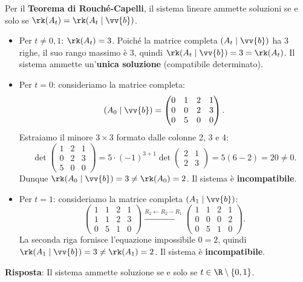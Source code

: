 \begin{dimostrazione}
Per il \textbf{Teorema di Rouché-Capelli}, il sistema lineare ammette soluzioni se e solo se $\rk(A_t) = \rk(A_t \mid \vv{b})$.
\begin{itemize}
    \item Per $t \neq 0, 1$: $\rk(A_t) = 3$. Poiché la matrice completa $(A_t \mid \vv{b})$ ha 3 righe, il suo rango massimo è 3, quindi $\rk(A_t \mid \vv{b}) = 3 = \rk(A_t)$. Il sistema ammette un'\textbf{unica soluzione} (compatibile determinato).
    \item Per $t = 0$: consideriamo la matrice completa:
    \begin{equation}
        (A_0 \mid \vv{b}) = \begin{pmatrix} 0 & 1 & 2 & 1 \\ 0 & 0 & 2 & 3 \\ 0 & 5 & 0 & 0 \end{pmatrix}.
    \end{equation}
    Estraiamo il minore $3 \times 3$ formato dalle colonne 2, 3 e 4:
    \begin{equation}
        \det \begin{pmatrix} 1 & 2 & 1 \\ 0 & 2 & 3 \\ 5 & 0 & 0 \end{pmatrix} = 5 \cdot (-1)^{3+1} \det \begin{pmatrix} 2 & 1 \\ 2 & 3 \end{pmatrix} = 5(6 - 2) = 20 \neq 0.
    \end{equation}
    Dunque $\rk(A_0 \mid \vv{b}) = 3 \neq \rk(A_0) = 2$. Il sistema è \textbf{incompatibile}.
    \item Per $t = 1$: consideriamo la matrice completa $(A_1 \mid \vv{b})$:
    \begin{equation}
        \begin{pmatrix} 1 & 1 & 2 & 1 \\ 1 & 1 & 2 & 3 \\ 0 & 5 & 1 & 0 \end{pmatrix} \xrightarrow{R_2 \leftarrow R_2 - R_1} \begin{pmatrix} 1 & 1 & 2 & 1 \\ 0 & 0 & 0 & 2 \\ 0 & 5 & 1 & 0 \end{pmatrix}.
    \end{equation}
    La seconda riga fornisce l'equazione impossibile $0 = 2$, quindi $\rk(A_1 \mid \vv{b}) = 3 \neq \rk(A_1) = 2$. Il sistema è \textbf{incompatibile}.
\end{itemize}
\textbf{Risposta}: Il sistema ammette soluzione se e solo se $t \in \R \setminus \{0, 1\}$.


\end{dimostrazione}

